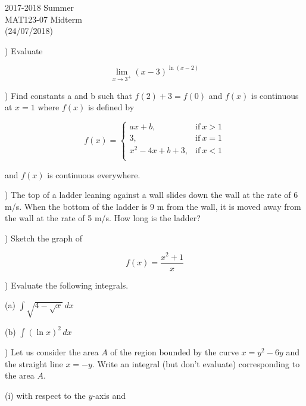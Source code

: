 \documentclass{article}
\begin{document}
\large

\begin{center}
2017-2018 Summer\\MAT123-07 Midterm\\(24/07/2018)
\end{center}

) Evaluate

\begin{equation*}\lim_{x\to3^+}(x-3)^{\ln(x-2)}\end{equation*}

\hfill

) Find constants a and b such that $f(2) + 3 = f(0)$ and $f(x)$ is continuous at $x=1$ where $f(x)$ is defined by

\[
f(x) =
\begin{cases}
ax + b, & \text{if}\ x > 1 \\
3, & \text{if}\ x = 1 \\
x^2-4x+b+3, & \text{if}\ x < 1 \\
\end{cases}
\]

\noindent and $f(x)$ is continuous everywhere.

\hfill

) The top of a ladder leaning against a wall slides down the wall at the rate of 6 m/s. When the bottom of the ladder is 9 m from the wall, it is moved away from the wall at the rate of 5 m/s. How long is the ladder?

\hfill

) Sketch the graph of

\begin{equation*}f(x) = \frac{x^2+1}{x}\end{equation*}

\hfill

) Evaluate the following integrals.

\hfill

\noindent (a) $\displaystyle \int\sqrt{4-\sqrt{x}}\, dx$

\noindent (b) $\displaystyle \int(\ln x)^2\, dx$

\hfill

) Let us consider the area $A$ of the region bounded by the curve $x=y^2-6y$ and the straight line $x=-y$. Write an integral (but don't evaluate) corresponding to the area $A$.

\hfill

\noindent (i) with respect to the $y$-axis and
\end{document}
